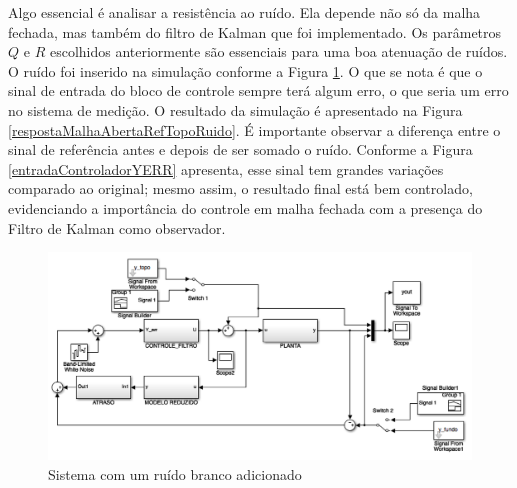 Algo essencial é analisar a resistência ao ruído. Ela depende não só da malha fechada, mas também do filtro de Kalman que foi implementado. Os parâmetros $Q$ e $R$ escolhidos anteriormente são essenciais para uma boa atenuação de ruídos. O ruído foi inserido na simulação conforme a Figura \ref{simulacaoComRuidoSimulink}. O que se nota é que o sinal de entrada do bloco de controle sempre terá algum erro, o que seria um erro no sistema de medição. O resultado da simulação é apresentado na Figura \ref{respostaMalhaAbertaRefTopoRuido}. É importante observar a diferença entre o sinal de referência antes e depois de ser somado o ruído. Conforme a Figura \ref{entradaControladorYERR} apresenta, esse sinal tem grandes variações comparado ao original; mesmo assim, o resultado final está bem controlado, evidenciando a importância do controle em malha fechada com a presença do Filtro de Kalman como observador. 

\begin{figure}[!ht]
\centering

\includegraphics[width=0.8\linewidth]{figs/resultados/simulacao/simulacaoComRuido}
\caption{Sistema com um ruído branco adicionado\label{simulacaoComRuidoSimulink}}
\end{figure}


